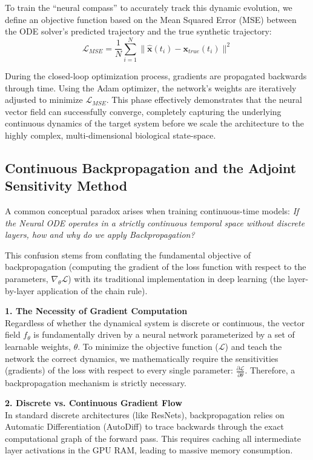 \documentclass[12pt, a4paper]{article}
\begin{document}
	To train the ``neural compass'' to accurately track this dynamic evolution, we define an objective function based on the Mean Squared Error (MSE) between the ODE solver's predicted trajectory and the true synthetic trajectory:
	$$ \mathcal{L}_{MSE} = \frac{1}{N} \sum_{i=1}^{N} \| \mathbf{\hat{x}}(t_i) - \mathbf{x}_{true}(t_i) \|^2 $$
	
	During the closed-loop optimization process, gradients are propagated backwards through time. Using the Adam optimizer, the network's weights are iteratively adjusted to minimize $\mathcal{L}_{MSE}$. This phase effectively demonstrates that the neural vector field can successfully converge, completely capturing the underlying continuous dynamics of the target system before we scale the architecture to the highly complex, multi-dimensional biological state-space.
	
	\subsection{Continuous Backpropagation and the Adjoint Sensitivity Method}
	
	A common conceptual paradox arises when training continuous-time models: \textit{If the Neural ODE operates in a strictly continuous temporal space without discrete layers, how and why do we apply Backpropagation?} 
	
	This confusion stems from conflating the fundamental objective of backpropagation (computing the gradient of the loss function with respect to the parameters, $\nabla_\theta \mathcal{L}$) with its traditional implementation in deep learning (the layer-by-layer application of the chain rule).
	
	\vspace{0.3cm}
	\noindent \textbf{1. The Necessity of Gradient Computation} \\
	Regardless of whether the dynamical system is discrete or continuous, the vector field $f_\theta$ is fundamentally driven by a neural network parameterized by a set of learnable weights, $\theta$. To minimize the objective function ($\mathcal{L}$) and teach the network the correct dynamics, we mathematically require the sensitivities (gradients) of the loss with respect to every single parameter: $\frac{\partial \mathcal{L}}{\partial \theta}$. Therefore, a backpropagation mechanism is strictly necessary.
	
	\vspace{0.3cm}
	\noindent \textbf{2. Discrete vs. Continuous Gradient Flow} \\
	In standard discrete architectures (like ResNets), backpropagation relies on Automatic Differentiation (AutoDiff) to trace backwards through the exact computational graph of the forward pass. This requires caching all intermediate layer activations in the GPU RAM, leading to massive memory consumption.
	
\end{document}
